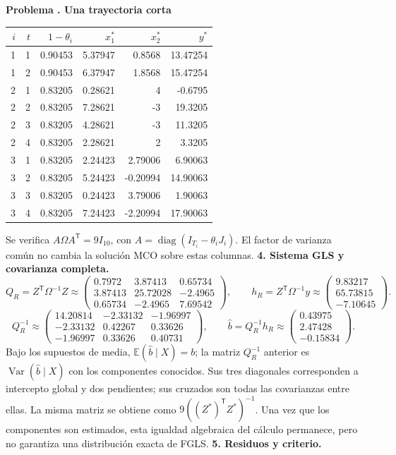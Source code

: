 \documentclass[11pt,a4paper]{article}
\newcommand{\E}{\mathbb E}
\newcommand{\T}{^{\mathsf T}}
\DeclareMathOperator{\Var}{Var}
\DeclareMathOperator{\diag}{diag}
\theoremstyle{definition}
\newcounter{problema}
\newenvironment{resuelto}[1]{\refstepcounter{problema}\par\medskip\Needspace{6\baselineskip}\textbf{Problema \theproblema. #1}\par}{\par\medskip}
\begin{document}
\begin{resuelto}{Una trayectoria corta}
\begin{center}\small
\begin{tabular}{rrrrrr}
\toprule
$i$&$t$&$1-\theta_i$&$x_1^*$&$x_2^*$&$y^*$\\
\midrule
1&1&0.90453&5.37947&0.8568&13.47254\\
1&2&0.90453&6.37947&1.8568&15.47254\\
2&1&0.83205&0.28621&4&-0.6795\\
2&2&0.83205&7.28621&-3&19.3205\\
2&3&0.83205&4.28621&-3&11.3205\\
2&4&0.83205&2.28621&2&3.3205\\
3&1&0.83205&2.24423&2.79006&6.90063\\
3&2&0.83205&5.24423&-0.20994&14.90063\\
3&3&0.83205&0.24423&3.79006&1.90063\\
3&4&0.83205&7.24423&-2.20994&17.90063\\
\bottomrule
\end{tabular}
\end{center}
Se verifica $A\Omega A\T=9I_{10}$, con $A=\diag(I_{T_i}-\theta_iJ_i)$. El factor de varianza común no cambia la solución MCO sobre estas columnas.
\textbf{4. Sistema GLS y covarianza completa.}
\[
Q_R=Z\T\Omega^{-1}Z\approx\begin{pmatrix}
0.7972&3.87413&0.65734\\3.87413&25.72028&-2.4965\\0.65734&-2.4965&7.69542
\end{pmatrix},\qquad h_R=Z\T\Omega^{-1}y\approx\begin{pmatrix}
9.83217\\65.73815\\-7.10645
\end{pmatrix}.
\]
\[
Q_R^{-1}\approx\begin{pmatrix}
14.20814&-2.33132&-1.96997\\-2.33132&0.42267&0.33626\\-1.96997&0.33626&0.40731
\end{pmatrix},\qquad \widehat b=Q_R^{-1}h_R\approx\begin{pmatrix}
0.43975\\2.47428\\-0.15834
\end{pmatrix}.
\]
Bajo los supuestos de media, $\E(\widehat b\mid X)=b$; la matriz $Q_R^{-1}$ anterior es $\Var(\widehat b\mid X)$ con los componentes conocidos. Sus tres diagonales corresponden a intercepto global y dos pendientes; sus cruzados son todas las covarianzas entre ellas.
La misma matriz se obtiene como $9((Z^*)\T Z^*)^{-1}$. Una vez que los componentes son estimados, esta igualdad algebraica del cálculo permanece, pero no garantiza una distribución exacta de FGLS.
\textbf{5. Residuos y criterio.}


\end{resuelto}
\end{document}
